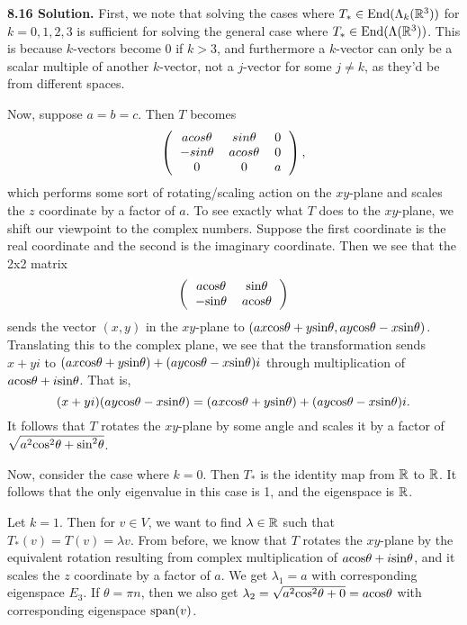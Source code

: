 \textbf{8.16 Solution.} First, we note that solving the cases where $T_* \in \text{End}(\Lambda_k(\mathbb{R}^3))$ for $k = 0, 1, 2, 3$ is sufficient for solving the general case where $T_* \in \text{End}(\Lambda(\mathbb{R}^3))$. This is because $k$-vectors become 0 if $k > 3$, and furthermore a $k$-vector can only be a scalar multiple of another $k$-vector, not a $j$-vector for some $j \neq k$, as they'd be from different spaces.

Now, suppose $a = b = c$. Then $T$ becomes
\[\left(
\begin{tabular}{ccc}
    $acos\theta$ & $sin\theta$ & 0 \\
    $-sin\theta$ & $acos\theta$ & 0 \\
    0 & 0 & $a$
\end{tabular}
\right),\]
which performs some sort of rotating/scaling action on the $xy$-plane and scales the $z$ coordinate by a factor of $a$. To see exactly what $T$ does to the $xy$-plane, we shift our viewpoint to the complex numbers. Suppose the first coordinate is the real coordinate and the second is the imaginary coordinate. Then we see that the 2x2 matrix
\[\left(
\begin{tabular}{cc}
    $a\f{cos}\theta$ & $\f{sin}\theta$ \\
    $-\f{sin}\theta$ & $a\f{cos}\theta$
\end{tabular}
\right)\]
sends the vector $(x, y)$ in the $xy$-plane to $(ax\text{cos}\theta + y\text{sin}\theta, ay\text{cos}\theta - x\text{sin}\theta)$. Translating this to the complex plane, we see that the transformation sends $x + yi$ to $(ax\text{cos}\theta + y\text{sin}\theta) + (ay\text{cos}\theta - x\text{sin}\theta)i$ through multiplication of $a\text{cos}\theta + i\text{sin}\theta$. That is,
\[
    (x + yi)(ay\text{cos}\theta - x\text{sin}\theta) = (ax\text{cos}\theta + y\text{sin}\theta) + (ay\text{cos}\theta - x\text{sin}\theta)i.
\]
It follows that $T$ rotates the $xy$-plane by some angle and scales it by a factor of $\sqrt{a^2\text{cos}^2\theta + \text{sin}^2\theta}$.

Now, consider the case where $k = 0$. Then $T_*$ is the identity map from $\mathbb{R}$ to $\mathbb{R}$. It follows that the only eigenvalue in this case is 1, and the eigenspace is $\mathbb{R}$.

Let $k = 1$. Then for $v \in V$, we want to find $\lambda \in \mathbb{R}$ such that $T_*(v) = T(v) = \lambda v$. From before, we know that $T$ rotates the $xy$-plane by the equivalent rotation resulting from complex multiplication of $a\text{cos}\theta + i\text{sin}\theta$, and it scales the $z$ coordinate by a factor of $a$. We get $\lambda_1 = a$ with corresponding eigenspace $E_3$. If $\theta = \pi n$, then we also get $\lambda_2 = \sqrt{a^2\text{cos}^2\theta + 0} = a\text{cos}\theta$ with corresponding eigenspace $\text{span}(v)$.

